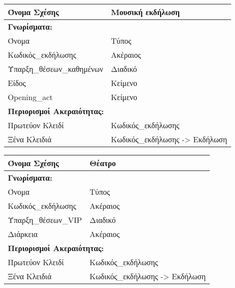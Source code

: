\begin{tabular}{|p{6cm}|p{8cm}|}
  \hline
  Όνομα Σχέσης            & Μουσική εκδήλωση               \\ \hline
  \multicolumn{2}{|l|}{\textbf{Γνωρίσματα:}}               \\ \hline
  Όνομα                   & Τύπος                          \\ \hline
  Κωδικός\_εκδήλωσης       & Ακέραιος                       \\ \hline
  Ύπαρξη\_θέσεων\_καθημένων & Διαδικό                        \\ \hline
  Είδος                   & Κείμενο                        \\ \hline
  Opening\_act             & Κείμενο                        \\ \hline
  \multicolumn{2}{|l|}{\textbf{Περιορισμοί Ακεραιότητας:}} \\ \hline
  Πρωτεύον Κλειδί         & Κωδικός\_εκδήλωσης              \\ \hline
  Ξένα Κλειδιά            & Κωδικός\_εκδήλωσης -> Εκδήλωση  \\ \hline
\end{tabular}

\begin{tabular}{|p{6cm}|p{8cm}|}
  \hline
  Όνομα Σχέσης      & Θέατρο                               \\ \hline
  \multicolumn{2}{|l|}{\textbf{Γνωρίσματα:}}               \\ \hline
  Όνομα             & Τύπος                                \\ \hline
  Κωδικός\_εκδήλωσης & Ακέραιος                             \\ \hline
  Ύπαρξη\_θέσεων\_VIP & Διαδικό                              \\ \hline
  Διάρκεια          & Ακέραιος                             \\ \hline
  \multicolumn{2}{|l|}{\textbf{Περιορισμοί Ακεραιότητας:}} \\ \hline
  Πρωτεύον Κλειδί   & Κωδικός\_εκδήλωσης                    \\ \hline
  Ξένα Κλειδιά      & Κωδικός\_εκδήλωσης -> Εκδήλωση        \\ \hline
\end{tabular}

